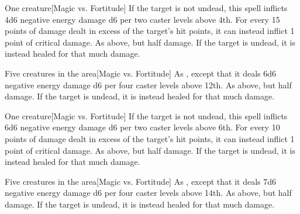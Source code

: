 \spellrng{\rngclose}
\begin{spelltarget}{One creature}[Magic vs. Fortitude]
    \spellsuccess If the target is not undead, this spell inflicts 4d6 negative energy damage \add d6 per two caster levels above 4th. For every 15 points of damage dealt in excess of the target's hit points, it can instead inflict 1 point of critical damage.
    \spellfailure As above, but half damage.
    \spelleffect If the target is undead, it is instead healed for that much damage.
\end{spelltarget}

\begin{spelltargets}{Five creatures in the area}[Magic vs. Fortitude]
    \spellsuccess As , except that it deals 6d6 negative energy damage \add d6 per four caster levels above 12th.
    \spellfailure As above, but half damage.
    \spelleffect If the target is undead, it is instead healed for that much damage.
\end{spelltargets}

\spellrng{\rngclose}
\begin{spelltarget}{One creature}[Magic vs. Fortitude]
    \spellsuccess If the target is not undead, this spell inflicts 6d6 negative energy damage \add d6 per two caster levels above 6th. For every 10 points of damage dealt in excess of the target's hit points, it can instead inflict 1 point of critical damage.
    \spellfailure As above, but half damage.
    \spelleffect If the target is undead, it is instead healed for that much damage.
\end{spelltarget}

\begin{spelltargets}{Five creatures in the area}[Magic vs. Fortitude]
    \spellsuccess As , except that it deals 7d6 negative energy damage \add d6 per four caster levels above 14th.
    \spellfailure As above, but half damage.
    \spelleffect If the target is undead, it is instead healed for that much damage.
\end{spelltargets}

